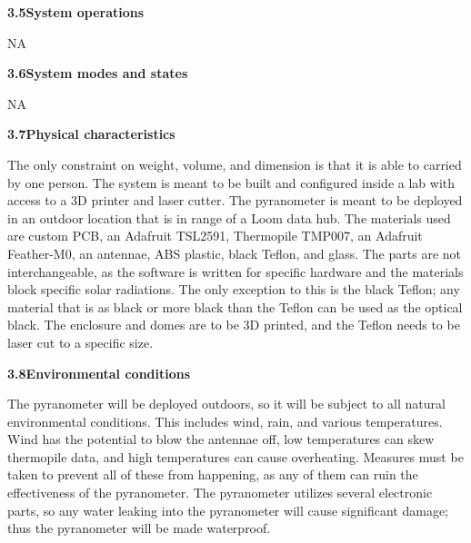 \documentclass[10pt,draftclsnofoot,onecolumn,letterpaper]{article}
\begin{document}
{\fontsize{10pt}{12.0pt} \textbf{3.5\quad System operations}\\\selectfont 
\par}\par
{\fontsize{10pt}{12.0pt}NA\\\selectfont 
\par}\par

{\fontsize{10pt}{12.0pt} \textbf{3.6\quad System modes and states}\\\selectfont 
\par}\par
{\fontsize{10pt}{12.0pt} NA\\\selectfont 
\par}\par

{\fontsize{10pt}{12.0pt} \textbf{3.7\quad Physical characteristics}\\\selectfont 
\par}\par
{\fontsize{10pt}{12.0pt} The only constraint on weight, volume, and dimension is that it is able to carried by one person. The system is meant to be built and configured inside a lab with access to a 3D printer and laser cutter. The pyranometer is meant to be deployed in an outdoor location that is in range of a Loom data hub. The materials used are custom PCB, an Adafruit TSL2591, Thermopile TMP007, an Adafruit Feather-M0, an antennae, ABS plastic, black Teflon, and glass. The parts are not interchangeable, as the software is written for specific hardware and the materials block specific solar radiations. The only exception to this is the black Teflon; any material that is as black or more black than the Teflon can be used as the optical black. The enclosure and domes are to be 3D printed, and the Teflon needs to be laser cut to a specific size. \\\selectfont 
\par}\par

{\fontsize{10pt}{12.0pt} \textbf{3.8\quad Environmental conditions}\\\selectfont 
\par}\par
{\fontsize{10pt}{12.0pt}The pyranometer will be deployed outdoors, so it will be subject to all natural environmental conditions. This includes wind, rain, and various temperatures. Wind has the potential to blow the antennae off, low temperatures can skew thermopile data, and high temperatures can cause overheating. Measures must be taken to prevent all of these from happening, as any of them can ruin the effectiveness of the pyranometer. The pyranometer utilizes several electronic parts, so any water leaking into the pyranometer will cause significant damage; thus the pyranometer will be made waterproof. \\\selectfont 
\par}\par
\end{document}
